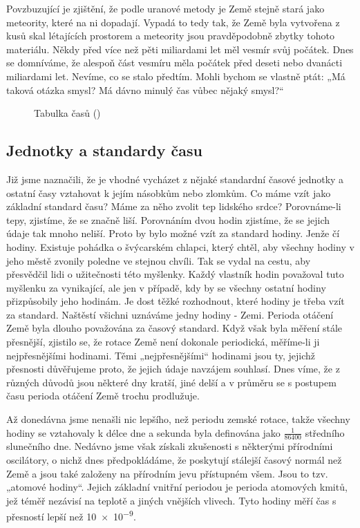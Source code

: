      Povzbuzující je zjištění, že podle uranové metody je Země stejně stará jako meteority, které
      na ni dopadají. Vypadá to tedy tak, že Země byla vytvořena z kusů skal létajících prostorem a
      meteority jsou pravděpodobně zbytky tohoto materiálu. Někdy před více než pěti miliardami let
      měl vesmír svůj počátek. Dnes se domníváme, že alespoň část vesmíru měla počátek před deseti
      nebo dvanácti miliardami let. Nevíme, co se stalo předtím. Mohli bychom se vlastně ptát: „Má
      taková otázka smysl? Má dávno minulý čas vůbec nějaký smysl?“
      
      \begin{figure}[ht!]  %
        \centering
        \caption{Tabulka časů (\cite[s.~69]{Feynman01})}
        \label{fyz:fig0075}
      \end{figure}

    \subsection{Jednotky a standardy času}
      Již jsme naznačili, že je vhodné vycházet z nějaké standardní časové jednotky a ostatní časy
      vztahovat k jejím násobkům nebo zlomkům. Co máme vzít jako základní standard času? Máme za
      něho zvolit tep lidského srdce? Porovnáme-li tepy, zjistíme, že se značně liší. Porovnáním
      dvou hodin zjistíme, že se jejich údaje tak mnoho neliší. Proto by bylo možné vzít za standard
      hodiny. Jenže čí hodiny. Existuje pohádka o švýcarském chlapci, který chtěl, aby všechny
      hodiny v jeho městě zvonily poledne ve stejnou chvíli. Tak se vydal na cestu, aby přesvědčil
      lidi o užitečnosti této myšlenky. Každý vlastník hodin považoval tuto myšlenku za vynikající,
      ale jen v případě, kdy by se všechny ostatní hodiny přizpůsobily jeho hodinám. Je dost těžké
      rozhodnout, které hodiny je třeba vzít za standard. Naštěstí všichni uznáváme jedny hodiny -
      Zemi. Perioda otáčení Země byla dlouho považována za časový standard. Když však byla měření
      stále přesnější, zjistilo se, že rotace Země není dokonale periodická, měříme-li ji
      nejpřesnějšími hodinami. Těmi „nejpřesnějšími“ hodinami jsou ty, jejichž přesnosti důvěřujeme
      proto, že jejich údaje navzájem souhlasí. Dnes víme, že z různých důvodů jsou některé dny
      kratší, jiné delší a v průměru se s postupem času perioda otáčení Země trochu prodlužuje.
      
      Až donedávna jsme nenašli nic lepšího, než periodu zemské rotace, takže všechny hodiny se
      vztahovaly k délce dne a sekunda byla definována jako \(\frac{1}{\num{86400}}\) středního
      slunečního dne. Nedávno jsme však získali zkušenosti s některými přírodními oscilátory, o
      nichž dnes předpokládáme, že poskytují stálejší časový normál než Země a jsou také založeny na
      přírodním jevu přístupném všem. Jsou to tzv. „atomové hodiny“. Jejich základní vnitřní
      periodou je perioda atomových kmitů, jež téměř nezávisí na teplotě a jiných vnějších vlivech.
      Tyto hodiny měří čas s přesností lepší než \num{10e-9}.
      
